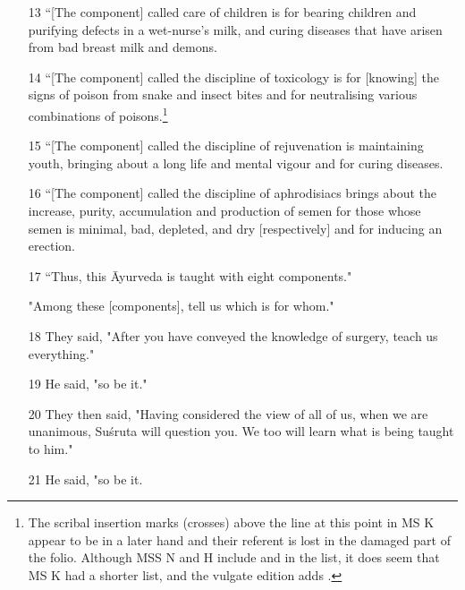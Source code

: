 \documentclass[12pt]{article}
\begin{document}
\begin{itemize}
        
        \item[13] “[The component] called care of children is for bearing children and 
        purifying defects in a wet-nurse's milk, and curing diseases that have arisen 
        from bad breast milk and demons.
        
        \item[14] “[The component] called the discipline of toxicology is for
[knowing] the signs of poison from snake and insect bites and for
neutralising various combinations of poisons.\footnote{The scribal
insertion marks (crosses) above the line at this point in MS K appear to
be in a later hand and their referent is lost in the damaged part of the
folio.  Although MSS N and H include  and
 in the list, it does seem that MS K had
a shorter list, and the vulgate edition adds .}
        
        \item[15] “[The component] called the discipline of rejuvenation is maintaining 
        youth, bringing about a long life and mental vigour and for curing diseases.
        
        
        \item[16] “[The component] called the discipline of aphrodisiacs brings about 
        the 
        increase, purity, accumulation and  production of semen for those whose semen 
        is minimal, bad, depleted, and dry [respectively] and for inducing an erection.
        
        \item[17] “Thus, this Āyurveda is taught with eight components."
        
        "Among these [components], tell us which is for whom."
        
        \item[18] They said, "After you have conveyed the knowledge of surgery, teach 
        us everything."
        
        \item[19] He said, "so be it."
        
        \item[20] They then said, "Having considered the view of all of us, when we are 
        unanimous, Suśruta will question you. We too will learn what is being taught to 
        him."
        
        \item[21] He said, "so be it.
        

\end{itemize}
\end{document}
